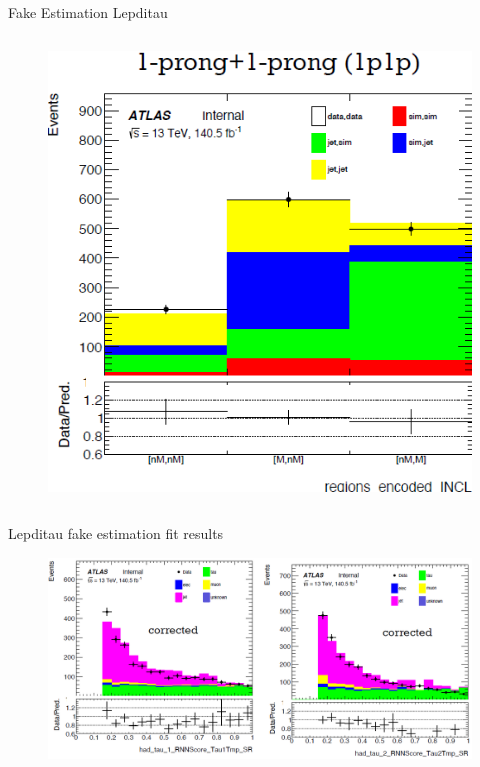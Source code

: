 \begin{frame}{Fake Estimation Lepditau}
\begin{columns}
\begin{column}{0.5\textwidth}
\begin{figure}
                \includegraphics[width=\textwidth]{oleh_2}
            \end{figure}
        \end{column}
    \end{columns}
\end{frame}

\begin{frame}{Lepditau fake estimation fit results}
    \begin{figure}
        \centering
        \includegraphics[width=\textwidth]{oleh_3}
    \end{figure}
\end{frame}

